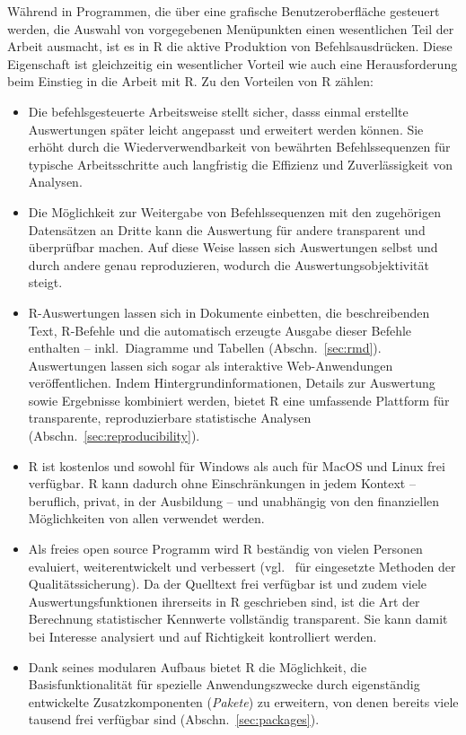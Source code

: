Während in Programmen, die über eine grafische Benutzeroberfläche gesteuert werden, die Auswahl von vorgegebenen Menüpunkten einen wesentlichen Teil der Arbeit ausmacht, ist es in R die aktive Produktion von Befehlsausdrücken. Diese Eigenschaft ist gleichzeitig ein wesentlicher Vorteil wie auch eine Herausforderung beim Einstieg in die Arbeit mit R. Zu den Vorteilen von R zählen:

\begin{itemize}
\item Die befehlsgesteuerte Arbeitsweise stellt sicher, dasss einmal erstellte Auswertungen später leicht angepasst und erweitert werden können. Sie erhöht durch die Wiederverwendbarkeit von bewährten Befehlssequenzen für typische Arbeitsschritte auch langfristig die Effizienz und Zuverlässigkeit von Analysen.
\item Die Möglichkeit zur Weitergabe von Befehlssequenzen mit den zugehörigen Datensätzen an Dritte kann die Auswertung für andere transparent und überprüfbar machen. Auf diese Weise lassen sich Auswertungen selbst und durch andere genau reproduzieren, wodurch die Auswertungsobjektivität steigt.
\item R-Auswertungen lassen sich in Dokumente einbetten, die beschreibenden Text, R-Befehle und die automatisch erzeugte Ausgabe dieser Befehle enthalten -- inkl.\ Diagramme und Tabellen (Abschn.\ \ref{sec:rmd}). Auswertungen lassen sich sogar als interaktive Web-Anwendungen veröffentlichen. Indem Hintergrundinformationen, Details zur Auswertung sowie Ergebnisse kombiniert werden, bietet R eine umfassende Plattform für transparente, reproduzierbare statistische Analysen (Abschn.\ \ref{sec:reproducibility}).
\item R ist kostenlos und sowohl für Windows als auch für MacOS und Linux frei verfügbar. R kann dadurch ohne Einschränkungen in jedem Kontext -- beruflich, privat, in der Ausbildung -- und unabhängig von den finanziellen Möglichkeiten von allen verwendet werden.
\item Als freies open source Programm wird R beständig von vielen Personen evaluiert, weiterentwickelt und verbessert (vgl.\  für eingesetzte Methoden der Qualitätssicherung). Da der Quelltext frei verfügbar ist und zudem viele Auswertungsfunktionen ihrerseits in R geschrieben sind, ist die Art der Berechnung statistischer Kennwerte vollständig transparent. Sie kann damit bei Interesse analysiert und auf Richtigkeit kontrolliert werden.
\item Dank seines modularen Aufbaus bietet R die Möglichkeit, die Basisfunktionalität für spezielle Anwendungszwecke durch eigenständig entwickelte Zusatzkomponenten (\emph{Pakete}) zu erweitern, von denen bereits viele tausend frei verfügbar sind (Abschn.\ \ref{sec:packages}).

\end{itemize}
